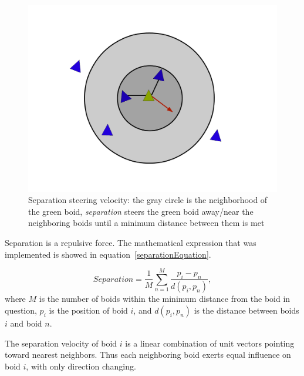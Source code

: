 \begin{figure}[htbp]
\begin{center}
\includegraphics[scale=0.3]{figures/separation.pdf}
\caption{Separation steering velocity: the gray circle is the neighborhood of the green boid, \textit{separation} steers the green boid away/near the neighboring boids until a minimum distance between them is met}
\label{separationPDF}
\end{center}
\end{figure}

Separation is a repulsive force. The mathematical expression that was implemented is showed in equation~\ref{separationEquation}.

\begin{equation}
\label{separationEquation}
Separation =\frac{1}{M} \sum_{n=1}^{M} \frac{p_i - p_n}{d(p_i,p_n)},
\end{equation}
where $M$ is the number of boids within the minimum distance from the boid in question, $p_i$ is the position of boid $i$, and $d(p_i,p_n)$ is the distance between boids $i$ and boid $n$.


The separation velocity of boid $i$ is a linear combination of 
unit vectors pointing toward nearest neighbors. Thus each neighboring boid exerts 
equal influence on boid $i$, with only direction changing. 

